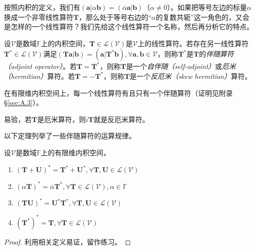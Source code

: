 \documentclass[main.tex]{subfiles}
\begin{document}
按照内积的定义，我们有$\left(\mathbf{a}|\alpha\mathbf{b}\right)=\left(\overline{\alpha}\mathbf{a}|\mathbf{b}\right)$（$\alpha\neq 0$）。如果把等号左边的标量$\alpha$换成一个非零线性算符$\mathbf{T}$，那么处于等号右边的“$\alpha$的复数共轭”这一角色的，又会是怎样的一个线性算符？我们先给这个线性算符一个名称，然后再分析它的特点。

\begin{definition}[伴随算符]\label{def:II.2.22}
    设$\mathcal{V}$是数域$\mathbb{F}$上的内积空间，$\mathbf{T}\in\mathcal{L}\left(\mathcal{V}\right)$是$\mathcal{V}$上的线性算符。若存在另一线性算符$\mathbf{T}^*\in\mathcal{L}\left(\mathcal{V}\right)$满足$\left(\mathbf{Ta}|\mathbf{b}\right)=\left(\mathbf{a}|\mathbf{T}^*\mathbf{b}\right),\forall\mathbf{a},\mathbf{b}\in\mathcal{V}$，则称$\mathbf{T}^*$是$\mathbf{T}$的\emph{伴随算符（adjoint operator）}。若$\mathbf{T}=\mathbf{T}^*$，则称$\mathbf{T}$是一个\emph{自伴随（self-adjoint）}或\emph{厄米（hermitian）}算符。若$\mathbf{T}=-\mathbf{T}^*$，则称$\mathbf{T}$是一个\emph{反厄米（skew hermitian）}算符。
\end{definition}

在有限维内积空间上，每一个线性算符有且只有一个伴随算符（证明见附录\S\ref{sec:A.3}）。

易验，若$\mathbf{T}$是厄米算符，则$i\mathbf{T}$就是反厄米算符。

以下定理列举了一些伴随算符的运算规律。

\begin{theorem}\label{thm:II.2.30}
    设$\mathcal{V}$是数域$\mathbb{F}$上的有限维内积空间，
    \begin{enumerate}
        \item $\left(\mathbf{T}+\mathbf{U}\right)^*=\mathbf{T}^*+\mathbf{U}^*,\forall\mathbf{T},\mathbf{U}\in\mathcal{L}\left(\mathcal{V}\right)$
        \item $\left(\alpha\mathbf{T}\right)^*=\overline{\alpha}\mathbf{T}^*,\forall\mathbf{T}\in\mathcal{L}\left(\mathcal{V}\right),\alpha\in\mathbb{F}$
        \item $\left(\mathbf{TU}\right)^*=\mathbf{U}^*\mathbf{T}^*,\forall\mathbf{T},\mathbf{U}\in\mathcal{L}\left(\mathcal{V}\right)$
        \item $\left(\mathbf{T}^*\right)^*=\mathbf{T},\forall\mathbf{T}\in\mathcal{L}\left(\mathcal{V}\right)$
    \end{enumerate}
\end{theorem}
\begin{proof}
    利用相关定义易证，留作练习。
\end{proof}
\end{document}

